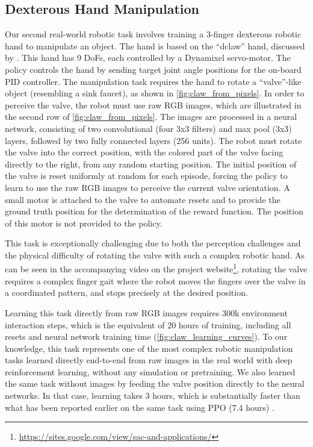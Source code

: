 \subsection{Dexterous Hand Manipulation}
Our second real-world robotic task involves training a 3-finger dexterous robotic hand to manipulate an object. The hand is based on the ``dclaw'' hand, discussed by \citep{zhu2018dexterous}. This hand has 9 DoFs, each controlled by a Dynamixel servo-motor. The policy controls the hand by sending target joint angle positions for the on-board PID controller. The manipulation task requires the hand to rotate a ``valve''-like object (resembling a sink faucet), as shown in \autoref{fig:claw_from_pixels}. In order to perceive the valve, the robot must use raw RGB images, which are illustrated in the second row of \autoref{fig:claw_from_pixels}. The images are processed in a neural network, consisting of two convolutional (four 3x3 filters) and max pool (3x3) layers, followed by two fully connected layers (256 units). The robot must rotate the valve into the correct position, with the colored part of the valve facing directly to the right, from any random starting position. The initial position of the valve is reset uniformly at random for each episode, forcing the policy to learn to use the raw RGB images to perceive the current valve orientation. A small motor is attached to the valve to automate resets and to provide the ground truth position for the determination of the reward function. The position of this motor is not provided to the policy.

This task is exceptionally challenging due to both the perception challenges and the physical difficulty of rotating the valve with such a complex robotic hand. As can be seen in the accompanying video on the project website\footnote{\href{https://sites.google.com/view/sac-and-applications/}{https://sites.google.com/view/sac-and-applications/}\label{footnote:webpage}}\!\!, rotating the valve requires a complex finger gait where the robot moves the fingers over the valve in a coordinated pattern, and stops precisely at the desired position.

Learning this task directly from raw RGB images requires 300k environment interaction steps, which is the equivalent of 20 hours of training, including all resets and neural network training time (\autoref{fig:claw_learning_curves}). To our knowledge, this task represents one of the most complex robotic manipulation tasks learned directly end-to-end from raw images in the real world with deep reinforcement learning, without any simulation or pretraining. We also learned the same task without images by feeding the valve position directly to the neural networks. In that case, learning takes 3 hours, which is substantially faster than what has been reported earlier on the same task using PPO (7.4 hours) \cite{zhu2018dexterous}.

